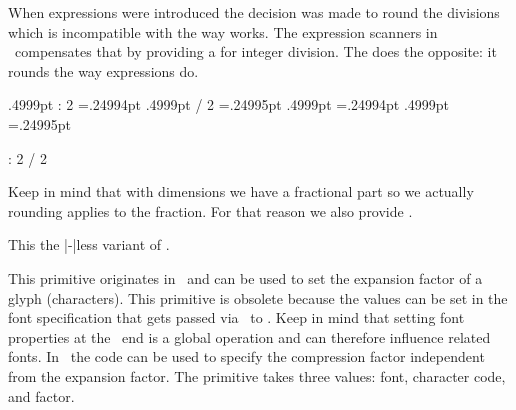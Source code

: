 \stopnewprimitive

\startnewprimitive[title={\prm {edivide}}]

When expressions were introduced the decision was made to round the divisions which is
incompatible with the way  works. The expression scanners in \LUAMETATEX\
compensates that by providing a \type {:} for integer division. The  does
the opposite: it rounds the way expressions do.

\startbuffer
\the\dimexpr .4999pt                     : 2 \relax           =.24994pt
\the\dimexpr .4999pt                     / 2 \relax           =.24995pt
\scratchdimen.4999pt \divide {} \the\scratchdimen=.24994pt
\scratchdimen.4999pt \edivide\scratchdimen 2 \the\scratchdimen=.24995pt

\the{}                        : 2 
\the\numexpr   1001                        / 2 \relax             =501
  \divide {} \the\scratchcounter=500
\scratchcounter1001  \edivide\scratchcounter 2 \the\scratchcounter=501
\stopbuffer

\typebuffer

Keep in mind that with dimensions we have a fractional part so we actually
rounding applies to the fraction. For that reason we also provide .

\startlines
\getbuffer
\stoplines

\stopnewprimitive

\startnewprimitive[title={\prm {edivideby}}]

This the |-|less variant of .

\stopnewprimitive

\startnewprimitive[title={\prm {efcode}}]

This primitive originates in \PDFTEX\ and can be used to set the expansion factor
of a glyph (characters). This primitive is obsolete because the values can be set
in the font specification that gets passed via \LUA\ to \TEX. Keep in mind that
setting font properties at the \TEX\ end is a global operation and can therefore
influence related fonts. In \LUAMETATEX\ the \prm {cf} code can be used to
specify the compression factor independent from the expansion factor. The
primitive takes three values: font, character code, and factor.

\stopnewprimitive

\startoldprimitive[title={\prm {else}}]

